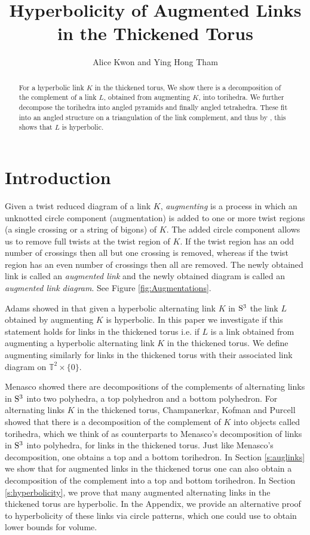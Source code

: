 \documentclass[11pt]{amsart}
\title{Hyperbolicity of Augmented Links in the Thickened Torus}
\author[Alice Kwon and Ying Hong Tham]{Alice Kwon and Ying Hong Tham}
\newcommand{\secref}[1]{Section \ref{#1}}
\newcommand{\Sp}{{\rm{S}}}
\newcommand{\torus}{{\mathbb{T}^2}}
\theoremstyle{plain}
\theoremstyle{definition}
\begin{document}
\maketitle

\begin{abstract}
For a hyperbolic link $K$ in the thickened torus, We show there is a decomposition of the complement
of a link $L$, obtained from augmenting $K$, into torihedra. We further decompose 
the torihedra into angled pyramids and finally angled tetrahedra. These fit into an angled structure 
on a triangulation of the link complement, and thus by \cite{Casson-Rivin}, this shows
that $L$ is hyperbolic.  
\end{abstract}

\section{Introduction}
\label{s:intro}

Given a twist reduced diagram of a link $K$, \emph{augmenting} is a process in
which an unknotted circle component (augmentation) is added to one or
more twist regions (a
single crossing or a string of bigons) of $K$. The added circle component
allows us to remove full twists at the twist region of $K$. If the twist region has an
odd number of crossings then all but one crossing is removed, whereas if the
twist region has an even number of crossings then all are removed. The newly
obtained link is called an \emph{augmented link} and the newly obtained diagram 
is called an \emph{augmented link diagram}. See Figure \ref{fig:Augmentations}. 

Adams showed in \cite{CA} that given a hyperbolic alternating link $K$ in
$\Sp^3$ the link $L$ obtained by augmenting $K$ is hyperbolic. In this paper
we investigate if this statement holds for links in the thickened torus i.e. if
$L$ is a link obtained from augmenting a hyperbolic alternating link $K$ in the
thickened torus. We define augmenting similarly for links in the thickened torus 
with their associated link diagram on $\torus \times \{0\}.$ 

Menasco \cite{Menasco} showed there are decompositions of the complements of 
alternating links in $\Sp^3$ into two polyhedra, a top polyhedron and a bottom polyhedron. 
For alternating links $K$ in the thickened torus, Champanerkar, Kofman and Purcell \cite{CKP2}
showed that there is a decomposition of the complement of $K$ into objects called torihedra,
which we think of 
as counterparts to Menasco's decomposition of links in $\Sp^3$ into polyhedra, for links in the thickened 
torus. Just like Menasco's decomposition, one obtains a top and a bottom torihedron.
In \secref{s:auglinks} we show that for augmented links in the thickened torus 
one can also obtain a decomposition of the complement into a top and bottom torihedron.
In \secref{s:hyperbolicity}, we prove that many augmented alternating links in the thickened torus
are hyperbolic.
In the Appendix, we provide an alternative proof to hyperbolicity of these links
via circle patterns, which one could use to obtain lower bounds for volume.
\end{document}
